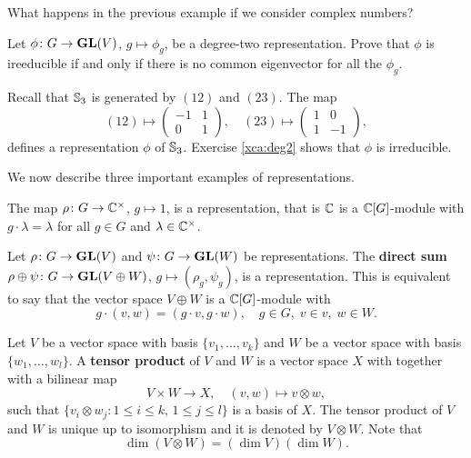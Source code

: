 What happens in the previous example if we consider complex numbers?

\begin{exercise}
  \label{xca:deg2}
  Let $\phi\colon G\to \mathbf{GL}(V)$, $g\mapsto\phi_g$, be a degree-two representation. Prove that
  $\phi$ is ireeducible if and only if there is no common eigenvector for all the $\phi_g$.
\end{exercise}

\begin{example}
  Recall that $\mathbb{S}_3$ is generated by $(12)$ and $(23)$. The map 
  \[(12)\mapsto\begin{pmatrix}
    -1 & 1\\
    0 & 1
  \end{pmatrix},
  \quad
  (23)\mapsto\begin{pmatrix}
    1 & 0\\
    1 & -1
  \end{pmatrix},
  \]
  defines a representation $\phi$ of $\mathbb{S}_3$. 
  Exercise \ref{xca:deg2} shows that $\phi$ is  
  irreducible.
\end{example}

We now describe three important examples of representations. 

\begin{example} 
    The map $\rho\colon G\to\mathbb{C}^{\times}$, $g\mapsto 1$, 
    is a representation, that is $\mathbb{C}$ is a $\mathbb{C}[G]$-module with
    $g\cdot \lambda=\lambda$ for all $g\in G$ 
    and $\lambda\in\mathbb{C}^{\times}$.
\end{example}

\begin{example}
    Let $\rho\colon G\to\mathbf{GL}(V)$ and 
    $\psi\colon G\to\mathbf{GL}(W)$ be representations. The \textbf{direct sum} 
    $\rho\oplus\psi\colon G\to\mathbf{GL}(V\oplus W)$, $g\mapsto (\rho_g,\psi_g)$, 
    is a representation. This is equivalent to say that
    the vector space $V\oplus W$ is a $\mathbb{C}[G]$-module with
    \[
    g\cdot (v,w)=(g\cdot v,g\cdot w),\quad
    g\in G,\;v\in v,\;w\in W.
    \]
\end{example}

Let $V$ be a vector space with basis $\{v_1,\dots,v_k\}$ and 
$W$ be a vector space with basis $\{w_1,\dots,w_l\}$. A 
\textbf{tensor product} of $V$ and $W$ is a vector space $X$ with 
together with a bilinear map 
\[
V\times W\to X,
\quad
(v,w)\mapsto v\otimes w,
\]
such that $\{v_i\otimes w_j:1\leq i\leq k,\,1\leq j\leq l\}$ is a  
basis of $X$. The tensor product of $V$ and $W$ is unique up to isomorphism 
and it is denoted by $V\otimes W$. Note that
\[
\dim(V\otimes W)=(\dim V)(\dim W).
\]


